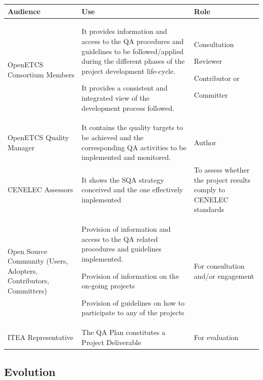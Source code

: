 \documentclass{template/openetcs_article}
\begin{document}
\begin{flushleft}
\tablefirsthead{}
\tablehead{}
\tabletail{}
\tablelasttail{}
\begin{supertabular}[H]{|m{3cm}|m{9cm}|m{3cm}|}
\hline
{}
Audience &
Use &
Role\\\hline
OpenETCS Consortium Members &
\begin{description}
\item It provides information and access to the QA procedures and guidelines to be followed/applied during the different phases of the project development life-cycle.
\item It provides a consistent and integrated view of the development process followed.
\end{description} &
\begin{description}
\item Consultation
\item Reviewer
\item Contributor or 
\item Committer
\end{description}\\\hline
OpenETCS Quality Manager &
It contains the quality targets to be achieved and the corresponding QA activities to be implemented and monitored. &
Author\\\hline
CENELEC Assessors &
It shows the SQA strategy conceived and the one effectively implemented &
To assess whether the project results comply to CENELEC standards\\\hline
Open Source Community (Users, Adopters, Contributors, Committers) &
\begin{description}
\item Provision of information and access to the QA related procedures and guidelines implemented.
\item Provision of information on the on-going projects
\item Provision of guidelines on how to participate to any of the projects
\end{description}
&
For consultation and/or engagement\\\hline
ITEA Representative &
The QA Plan constitutes a Project Deliverable &
For evaluation \\\hline
\end{supertabular}
\end{flushleft}


\subsection{Evolution}
\end{document}

